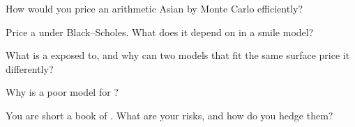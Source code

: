 \begin{interviewq}\label{iq:dv:asians-lookbacks-cliquets-and-forward-starts:2}
How would you price an arithmetic Asian by Monte Carlo efficiently?
\end{interviewq}

\begin{interviewq}\label{iq:dv:asians-lookbacks-cliquets-and-forward-starts:3}
Price a  under Black--Scholes. What does it depend on in a smile model?
\end{interviewq}

\begin{interviewq}\label{iq:dv:asians-lookbacks-cliquets-and-forward-starts:4}
What is a  exposed to, and why can two models that fit the same surface price it differently?
\end{interviewq}

\begin{interviewq}\label{iq:dv:asians-lookbacks-cliquets-and-forward-starts:5}
Why is  a poor model for ?
\end{interviewq}

\begin{interviewq}\label{iq:dv:asians-lookbacks-cliquets-and-forward-starts:6}
You are short a book of . What are your risks, and how do you hedge them?
\end{interviewq}
